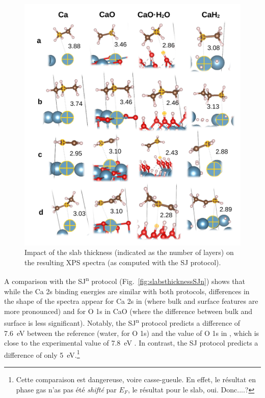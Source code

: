 \documentclass[12pt,a4paper]{article}
\begin{document}
\begin{figure}[!h]
	\centering
	\includegraphics[width=\linewidth]{Figure6}
	\caption{Impact of the slab thickness (indicated as the number of layers) on the resulting XPS spectra (as computed with the SJ protocol).}
	\label{fig:slabsthickness}
\end{figure}

A comparison with the SJ\textsuperscript{n} protocol (Fig.~\ref{fig:slabsthicknessSJn}) shows that while the Ca 2s binding energies are similar with both protocols, differences in the shape of the spectra appear for Ca 2s in  (where bulk and surface features are more pronounced) and for O 1s in CaO (where the difference between bulk and surface is less significant). Notably, the SJ\textsuperscript{n} protocol predicts a difference of \SI{7.6}{\electronvolt} between the reference (water, for O 1s) and the value of O 1s in , which is close to the experimental value of \SI{7.8}{\electronvolt} \cite{cristHandbookMonochromaticXPS1999}. In contrast, the SJ protocol predicts a difference of only \SI{5}{\electronvolt}.\footnote{Cette comparaison est dangereuse, voire casse-gueule. En effet, le résultat en phase gas n'as pas été \textit{shifté} par $E_F$, le résultat pour le slab, oui. Donc....?}
\end{document}
